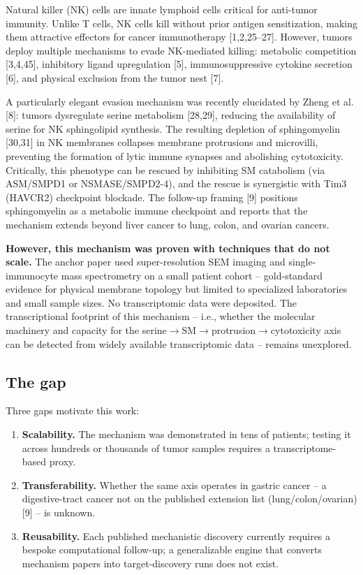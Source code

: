 \documentclass[modern,large,numbered,nocrop]{oup-authoring-template}
\begin{document}
Natural killer (NK) cells are innate lymphoid cells critical for anti-tumor immunity. Unlike T cells, NK cells kill without prior antigen sensitization, making them attractive effectors for cancer immunotherapy [1,2,25--27]. However, tumors deploy multiple mechanisms to evade NK-mediated killing: metabolic competition [3,4,45], inhibitory ligand upregulation [5], immunosuppressive cytokine secretion [6], and physical exclusion from the tumor nest [7].

A particularly elegant evasion mechanism was recently elucidated by Zheng et al. [8]: tumors dysregulate serine metabolism [28,29], reducing the availability of serine for NK sphingolipid synthesis. The resulting depletion of sphingomyelin [30,31] in NK membranes collapses membrane protrusions and microvilli, preventing the formation of lytic immune synapses and abolishing cytotoxicity. Critically, this phenotype can be rescued by inhibiting SM catabolism (via ASM/SMPD1 or NSMASE/SMPD2-4), and the rescue is synergistic with Tim3 (HAVCR2) checkpoint blockade. The follow-up framing [9] positions sphingomyelin as a metabolic immune checkpoint and reports that the mechanism extends beyond liver cancer to lung, colon, and ovarian cancers.

\textbf{However, this mechanism was proven with techniques that do not scale.} The anchor paper used super-resolution SEM imaging and single-immunocyte mass spectrometry on a small patient cohort -- gold-standard evidence for physical membrane topology but limited to specialized laboratories and small sample sizes. No transcriptomic data were deposited. The transcriptional footprint of this mechanism -- i.e., whether the molecular machinery and capacity for the serine$\to$SM$\to$protrusion$\to$cytotoxicity axis can be detected from widely available transcriptomic data -- remains unexplored.

\subsection{The gap}

Three gaps motivate this work:

\begin{enumerate}
\item \textbf{Scalability.} The mechanism was demonstrated in tens of patients; testing it across hundreds or thousands of tumor samples requires a transcriptome-based proxy.
\item \textbf{Transferability.} Whether the same axis operates in gastric cancer -- a digestive-tract cancer not on the published extension list (lung/colon/ovarian) [9] -- is unknown.
\item \textbf{Reusability.} Each published mechanistic discovery currently requires a bespoke computational follow-up; a generalizable engine that converts mechanism papers into target-discovery runs does not exist.
\end{enumerate}
\end{document}
